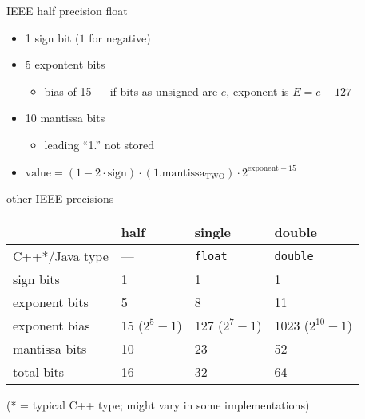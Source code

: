 \begin{frame}{IEEE half precision float}
\begin{itemize}
\item 1 sign bit ($1$ for negative)
\item 5 expontent bits
    \begin{itemize}
    \item bias of 15 --- if bits as unsigned are $e$, exponent is $E=e-127$
    \end{itemize}
\item 10 mantissa bits
    \begin{itemize}
    \item leading ``1.'' not stored
    \end{itemize}
\vspace{.5cm}
\item $\text{value} = (1-2\cdot \text{sign}) \cdot (1.\text{mantissa}_\text{TWO}) \cdot 2^{\text{exponent}-15}$
\end{itemize}
\end{frame}

\begin{frame}{other IEEE precisions}
\begin{tabular}{l|lll}
~ & half & single & double \\ \hline
C++*/Java type& --- & \texttt{float} & \texttt{double} \\
sign bits & 1 & 1 & 1 \\
exponent bits & 5 & 8 & 11 \\
    exponent bias & 15 {\small ($2^5-1$)} & 127 {\small ($2^7-1$)} & 1023 {\small ($2^{10}-1$)}\\
mantissa bits & 10 & 23 & 52 \\
total bits & 16 & 32 & 64 \\
\end{tabular}
    {\scriptsize (* = typical C++ type; might vary in some implementations)}
\end{frame}


